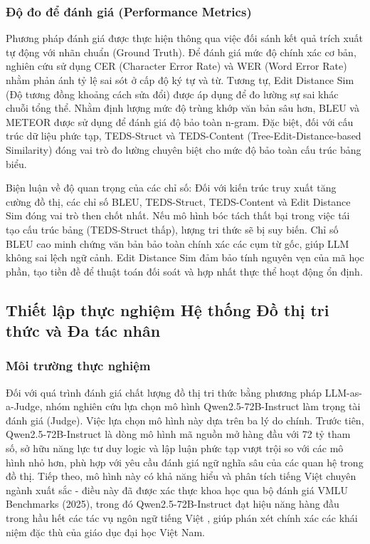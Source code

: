 \subsubsection{Độ đo để đánh giá (Performance Metrics)}
Phương pháp đánh giá được thực hiện thông qua việc đối sánh kết quả trích xuất tự động với nhãn chuẩn (Ground Truth). Để đánh giá mức độ chính xác cơ bản, nghiên cứu sử dụng CER (Character Error Rate) và WER (Word Error Rate) nhằm phản ánh tỷ lệ sai sót ở cấp độ ký tự và từ. Tương tự, Edit Distance Sim (Độ tương đồng khoảng cách sửa đổi) được áp dụng để đo lường sự sai khác chuỗi tổng thể. Nhằm định lượng mức độ trùng khớp văn bản sâu hơn, BLEU và METEOR được sử dụng để đánh giá độ bảo toàn n-gram. Đặc biệt, đối với cấu trúc dữ liệu phức tạp, TEDS-Struct và TEDS-Content (Tree-Edit-Distance-based Similarity) đóng vai trò đo lường chuyên biệt cho mức độ bảo toàn cấu trúc bảng biểu. 

Biện luận về độ quan trọng của các chỉ số: Đối với kiến trúc truy xuất tăng cường đồ thị, các chỉ số BLEU, TEDS-Struct, TEDS-Content và Edit Distance Sim đóng vai trò then chốt nhất. Nếu mô hình bóc tách thất bại trong việc tái tạo cấu trúc bảng (TEDS-Struct thấp), lượng tri thức sẽ bị suy biến. Chỉ số BLEU cao minh chứng văn bản bảo toàn chính xác các cụm từ gốc, giúp LLM không sai lệch ngữ cảnh. Edit Distance Sim đảm bảo tính nguyên vẹn của mã học phần, tạo tiền đề để thuật toán đối soát và hợp nhất thực thể hoạt động ổn định.

\subsection{Thiết lập thực nghiệm Hệ thống Đồ thị tri thức và Đa tác nhân}
\subsubsection{Môi trường thực nghiệm}
Đối với quá trình đánh giá chất lượng đồ thị tri thức bằng phương pháp LLM-as-a-Judge, nhóm nghiên cứu lựa chọn mô hình Qwen2.5-72B-Instruct \cite{qwen2.5} làm trọng tài đánh giá (Judge). Việc lựa chọn mô hình này dựa trên ba lý do chính. Trước tiên, Qwen2.5-72B-Instruct là dòng mô hình mã nguồn mở hàng đầu với 72 tỷ tham số, sở hữu năng lực tư duy logic và lập luận phức tạp vượt trội so với các mô hình nhỏ hơn, phù hợp với yêu cầu đánh giá ngữ nghĩa sâu của các quan hệ trong đồ thị. Tiếp theo, mô hình này có khả năng hiểu và phân tích tiếng Việt chuyên ngành xuất sắc - điều này đã được xác thực khoa học qua bộ đánh giá VMLU Benchmarks (2025), trong đó Qwen2.5-72B-Instruct đạt hiệu năng hàng đầu trong hầu hết các tác vụ ngôn ngữ tiếng Việt \cite{vmlu2025}, giúp phán xét chính xác các khái niệm đặc thù của giáo dục đại học Việt Nam.

